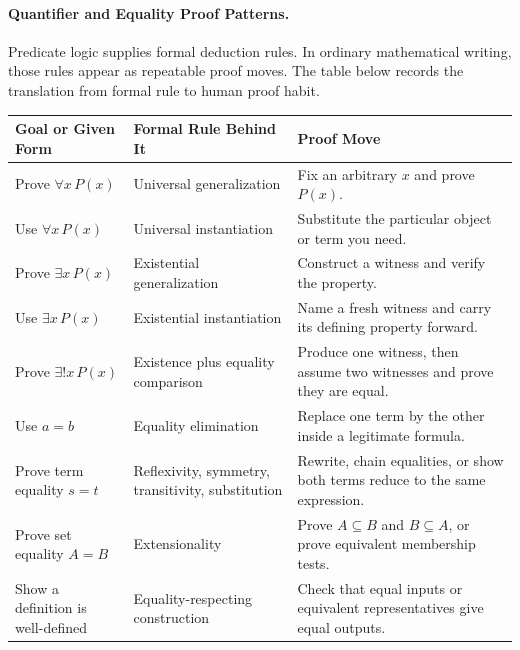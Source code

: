 \paragraph{Quantifier and Equality Proof Patterns.}

Predicate logic supplies formal deduction rules. In ordinary mathematical
writing, those rules appear as repeatable proof moves. The table below records
the translation from formal rule to human proof habit.

\begin{center}
\renewcommand{\arraystretch}{1.35}
\begin{tabular}{p{} p{} p{}}
\toprule
\textbf{Goal or Given Form} & \textbf{Formal Rule Behind It} & \textbf{Proof Move} \\
\midrule
Prove $\forall x\,P(x)$ &
  Universal generalization &
  Fix an arbitrary $x$ and prove $P(x)$. \\

Use $\forall x\,P(x)$ &
  Universal instantiation &
  Substitute the particular object or term you need. \\

Prove $\exists x\,P(x)$ &
  Existential generalization &
  Construct a witness and verify the property. \\

Use $\exists x\,P(x)$ &
  Existential instantiation &
  Name a fresh witness and carry its defining property forward. \\

Prove $\exists!x\,P(x)$ &
  Existence plus equality comparison &
  Produce one witness, then assume two witnesses and prove they are equal. \\

Use $a=b$ &
  Equality elimination &
  Replace one term by the other inside a legitimate formula. \\

Prove term equality $s=t$ &
  Reflexivity, symmetry, transitivity, substitution &
  Rewrite, chain equalities, or show both terms reduce to the same expression. \\

Prove set equality $A=B$ &
  Extensionality &
  Prove $A\subseteq B$ and $B\subseteq A$, or prove equivalent membership tests. \\

Show a definition is well-defined &
  Equality-respecting construction &
  Check that equal inputs or equivalent representatives give equal outputs. \\
\bottomrule
\end{tabular}
\end{center}


